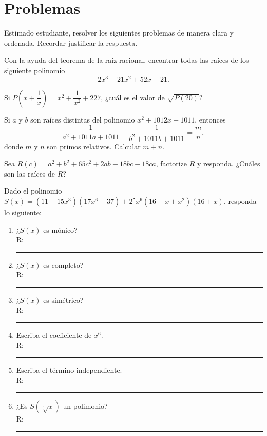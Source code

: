 \section*{\large Problemas}

Estimado estudiante, resolver los siguientes problemas de manera clara y ordenada.
Recordar justificar la respuesta.

\begin{problem}
    Con la ayuda del teorema de la raíz racional, encontrar todas las raíces de los siguiente polinomio
    \[2 x^3 - 21 x^2 + 52 x - 21.\]
\end{problem}

\begin{problem}
    Si $P\left(x + \dfrac{1}{x}\right) = x^2 + \dfrac{1}{x^2} + 227$, ¿cuál es el valor de $\sqrt {P(20)}$?
\end{problem}

\begin{problem}
    Si $a$ y $b$ son raíces distintas del polinomio $x^2 + 1012x + 1011$, entonces
    \[\frac{1}{a^2 + 1011a + 1011} + \frac{1}{b^2 + 1011b + 1011} = \frac{m}{n},\]
    donde $m$ y $n$ son primos relativos.
    Calcular $m + n$.
\end{problem}

\begin{problem}
    Sea $R(c) = a^2 + b^2 + 65c^2 + 2ab - 18bc - 18ca$, factorize $R$ y responda.
    ¿Cuáles son las raíces de $R$?
\end{problem}

\begin{problem}
    Dado el polinomio $S(x) = (11 - 15x^3)(17x^6 - 37) + 2^8 x^6 (16 - x + x^2)(16 + x)$, responda lo siguiente:
    \begin{multicols}{2}
        \begin{enumerate}
            \item ¿$S(x)$ es mónico? \\R: \rule{1cm}{0.1mm}
            \item ¿$S(x)$ es completo? \\R: \rule{1cm}{0.1mm}
            \item ¿$S(x)$ es simétrico? \\R: \rule{1cm}{0.1mm}
            \item Escriba el coeficiente de $x^6$. \\R: \rule{1cm}{0.1mm}
            \item Escriba el término independiente.\\ R: \rule{1cm}{0.1mm}
            \item ¿Es $S\left(\sqrt[3]{x}\right)$ un polimonio? \\ R: \rule{2cm}{0.1mm}
        \end{enumerate}
    \end{multicols}
\end{problem}

